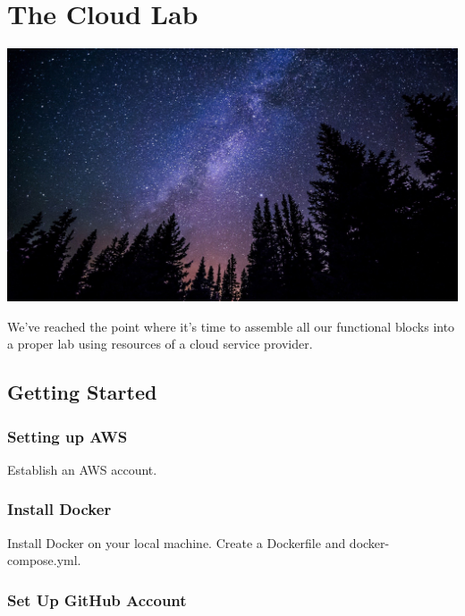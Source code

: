 \makeatletter
{}
\renewcommand{\thefigure}{\thechapter.\@arabic\c@figure}
\makeatother

\hypertarget{the-cloud-lab}{%
\section{The Cloud Lab}\label{the-cloud-lab}}

\includegraphics{../images/milky-way-984050_1920.jpg}

We've reached the point where it's time to assemble all our functional
blocks into a proper lab using resources of a cloud service provider.

\hypertarget{getting-started}{%
\subsection{Getting Started}\label{getting-started}}

\hypertarget{setting-up-aws}{%
\subsubsection{Setting up AWS}\label{setting-up-aws}}

Establish an AWS account.

\hypertarget{install-docker}{%
\subsubsection{Install Docker}\label{install-docker}}

Install Docker on your local machine. Create a Dockerfile and
docker-compose.yml.

\hypertarget{set-up-github-account}{%
\subsubsection{Set Up GitHub Account}\label{set-up-github-account}}


